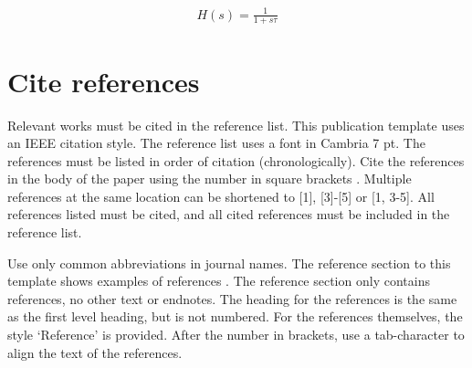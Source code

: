 \documentclass{paper}
\begin{document}
\begin{align}
    H(s)=\frac{1}{1+s\tau}
\end{align}

\section{Cite references}

Relevant works must be cited in the reference list.
This publication template uses an IEEE citation style.
The reference list uses a font in Cambria 7 pt.
The references must be listed in order of citation (chronologically).
Cite the references in the body of the paper using the number in square brackets \cite{watanabe2019simd}.
Multiple references at the same location can be shortened to [1], [3]-[5] or [1, 3-5].
All references listed must be cited, and all cited references must be included in the reference list.

Use only common abbreviations in journal names.
The reference section to this template shows examples of references \cite{watanabe2019simd,kahan1996ieee}.
The reference section only contains references, no other text or endnotes.
The heading for the references is the same as the first level heading, but is not numbered.
For the references themselves, the style ‘Reference’ is provided. After the number in brackets, use a tab-character to align the text of the references.
\end{document}
